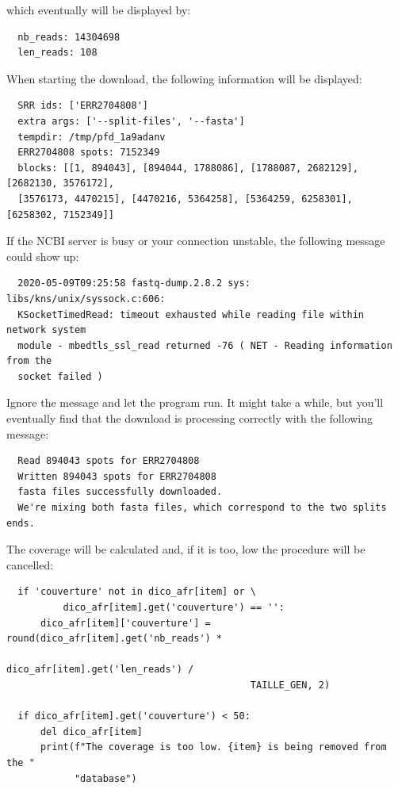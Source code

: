 \documentclass[twoside,a4paper,11pt,frenchb,openany]{report}
\begin{document}
    which eventually will be displayed by:

    \begin{verbatim}
  nb_reads: 14304698
  len_reads: 108
\end{verbatim}

    When starting the download, the following information will be displayed:

    \begin{verbatim}
  SRR ids: ['ERR2704808']
  extra args: ['--split-files', '--fasta']
  tempdir: /tmp/pfd_1a9adanv
  ERR2704808 spots: 7152349
  blocks: [[1, 894043], [894044, 1788086], [1788087, 2682129], [2682130, 3576172], 
  [3576173, 4470215], [4470216, 5364258], [5364259, 6258301], [6258302, 7152349]]
\end{verbatim}

    If the NCBI server is busy or your connection unstable, the following
message could show up:

    \begin{verbatim}
  2020-05-09T09:25:58 fastq-dump.2.8.2 sys: libs/kns/unix/syssock.c:606:
  KSocketTimedRead: timeout exhausted while reading file within network system 
  module - mbedtls_ssl_read returned -76 ( NET - Reading information from the 
  socket failed )
\end{verbatim}

    Ignore the message and let the program run. It might take a while, but
you'll eventually find that the download is processing correctly with
the following message:

    \begin{verbatim}
  Read 894043 spots for ERR2704808
  Written 894043 spots for ERR2704808
  fasta files successfully downloaded.
  We're mixing both fasta files, which correspond to the two splits ends.
\end{verbatim}

    The coverage will be calculated and, if it is too, low the procedure
will be cancelled:

 \begin{verbatim}
  if 'couverture' not in dico_afr[item] or \
          dico_afr[item].get('couverture') == '':
      dico_afr[item]['couverture'] = round(dico_afr[item].get('nb_reads') *
                                           dico_afr[item].get('len_reads') /
                                           TAILLE_GEN, 2)
        
  if dico_afr[item].get('couverture') < 50:
      del dico_afr[item]
      print(f"The coverage is too low. {item} is being removed from the "
            "database")
\end{verbatim}
\end{document}
